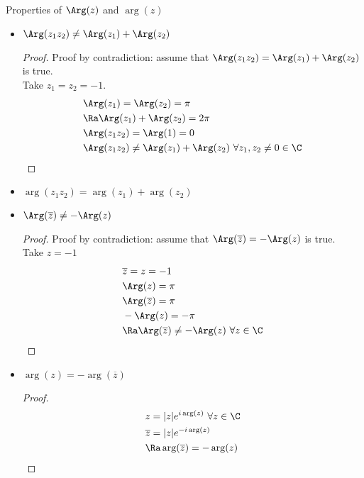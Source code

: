 Properties of $\Arg(z)$ and $\arg(z)$
\begin{itemize}
    \item $\Arg(z_1z_2)\neq\Arg(z_1)+\Arg(z_2)$
\begin{proof}
Proof by contradiction: assume that $\Arg(z_1z_2)=\Arg(z_1)+\Arg(z_2)$ is true.\\
Take $z_1=z_2=-1$.
\begin{align*}
    &\Arg(z_1)=\Arg(z_2)=\pi\\
    &\Ra \Arg(z_1)+\Arg(z_2)=2\pi\\
    &\Arg(z_1z_2)=\Arg(1)=0\\
    &\Arg(z_1z_2)\neq\Arg(z_1)+\Arg(z_2)\ \forall z_1,z_2\neq0\in\C
\end{align*}
\end{proof}
\item $\arg(z_1z_2)=\arg(z_1)+\arg(z_2)$
\item $ \Arg(\overline{z})\neq-\Arg(z) $
\begin{proof}
Proof by contradiction: assume that $\Arg(\overline{z})=-\Arg(z)$ is true.\\
Take $z=-1$
\begin{align*}
    &\overline{z}=z=-1\\
    &\Arg(z)=\pi\\
    &\Arg(\overline{z})=\pi\\
    &-\Arg(z)=-\pi\\
    &\Ra \Arg(\overline{z})\neq-\Arg(z)\ \forall z\in\C
\end{align*}
\end{proof}
\item $ \arg(z)=-\arg(\overline{z}) $
\begin{proof}
\begin{align*}
    &z=|z|e^{i\arg(z)}\ \forall z\in\C\\
    &\overline{z}=|z|e^{-i\arg(z)}\\
    &\Ra \arg(\overline{z})=-\arg(z)
\end{align*}
\end{proof}
\end{itemize}








